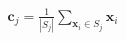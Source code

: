 \documentclass[preview]{standalone}
\begin{document}
\begin{align*}
\mathbf{c}_j = \frac{1}{|S_j|} \sum_{\mathbf{x}_i \in S_j} \mathbf{x}_i
\end{align*}
\end{document}
